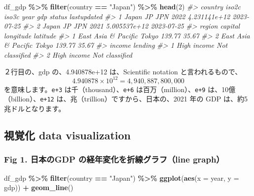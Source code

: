 \documentclass[
  xelatex, ja=standard]{bxjsbook}
\newenvironment{Shaded}{\begin{snugshade}}{\end{snugshade}}
\newcommand{\AttributeTok}[1]{\textcolor[rgb]{0.13,0.29,0.53}{#1}}
\newcommand{\CommentTok}[1]{\textcolor[rgb]{0.56,0.35,0.01}{\textit{#1}}}
\newcommand{\DecValTok}[1]{\textcolor[rgb]{0.00,0.00,0.81}{#1}}
\newcommand{\FunctionTok}[1]{\textcolor[rgb]{0.13,0.29,0.53}{\textbf{#1}}}
\newcommand{\NormalTok}[1]{#1}
\newcommand{\SpecialCharTok}[1]{\textcolor[rgb]{0.81,0.36,0.00}{\textbf{#1}}}
\newcommand{\StringTok}[1]{\textcolor[rgb]{0.31,0.60,0.02}{#1}}
\theoremstyle{definition}
\theoremstyle{definition}
\theoremstyle{definition}
\theoremstyle{definition}
\theoremstyle{remark}
\begin{document}
\begin{Shaded}
\begin{Highlighting}[]
\NormalTok{df\_gdp }\SpecialCharTok{\%\textgreater{}\%} \FunctionTok{filter}\NormalTok{(country }\SpecialCharTok{==} \StringTok{"Japan"}\NormalTok{) }\SpecialCharTok{\%\textgreater{}\%} \FunctionTok{head}\NormalTok{(}\DecValTok{2}\NormalTok{)}
\CommentTok{\#\textgreater{}   country iso2c iso3c year          gdp status lastupdated}
\CommentTok{\#\textgreater{} 1   Japan    JP   JPN 2022 4.231141e+12         2023{-}07{-}25}
\CommentTok{\#\textgreater{} 2   Japan    JP   JPN 2021 5.005537e+12         2023{-}07{-}25}
\CommentTok{\#\textgreater{}                region capital longitude latitude}
\CommentTok{\#\textgreater{} 1 East Asia \& Pacific   Tokyo    139.77    35.67}
\CommentTok{\#\textgreater{} 2 East Asia \& Pacific   Tokyo    139.77    35.67}
\CommentTok{\#\textgreater{}        income        lending}
\CommentTok{\#\textgreater{} 1 High income Not classified}
\CommentTok{\#\textgreater{} 2 High income Not classified}
\end{Highlighting}
\end{Shaded}

２行目の、gdp の、4.940878e+12 は、Scientific notation と言われるもので、 \[4.940878 \times 10^{12} = 4,940,887,800,000\] を意味します。\texttt{e+3} は千（thousand）、\texttt{e+6} は百万（million）、\texttt{e+9} は、10億（billion）、\texttt{e+12} は、兆（trillion）ですから、日本の、2021 年の GDP は、約5兆ドルとなります。

\hypertarget{ux8996ux899aux5316-data-visualization}{%
\subsection{視覚化 data visualization}\label{ux8996ux899aux5316-data-visualization}}

\hypertarget{fig-1.-ux65e5ux672cux306egdp-ux306eux7d4cux5e74ux5909ux5316ux3092ux6298ux7ddaux30b0ux30e9ux30d5line-graph}{%
\subsubsection{Fig 1. 日本のGDP の経年変化を折線グラフ（line graph）}\label{fig-1.-ux65e5ux672cux306egdp-ux306eux7d4cux5e74ux5909ux5316ux3092ux6298ux7ddaux30b0ux30e9ux30d5line-graph}}

\begin{Shaded}
\begin{Highlighting}[]
\NormalTok{df\_gdp }\SpecialCharTok{\%\textgreater{}\%} \FunctionTok{filter}\NormalTok{(country }\SpecialCharTok{==} \StringTok{"Japan"}\NormalTok{) }\SpecialCharTok{\%\textgreater{}\%}
  \FunctionTok{ggplot}\NormalTok{(}\FunctionTok{aes}\NormalTok{(}\AttributeTok{x =}\NormalTok{ year, }\AttributeTok{y =}\NormalTok{ gdp)) }\SpecialCharTok{+} \FunctionTok{geom\_line}\NormalTok{()}
\end{Highlighting}
\end{Shaded}
\end{document}
